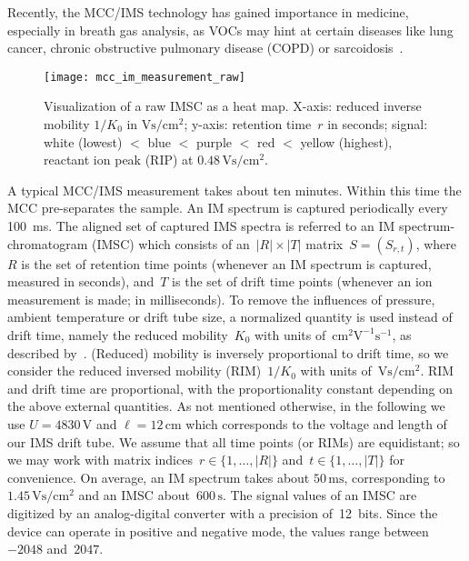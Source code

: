 \documentclass{article}
\begin{document}
Recently, the MCC/IMS technology has gained importance in medicine, especially in breath gas analysis, as VOCs may hint at certain diseases like lung cancer, chronic obstructive pulmonary disease (COPD) or sarcoidosis~\citep{Westhoff/etal/2009a, bodeker2008peakcomp, bunkowski/etal/2009a, westhoff2010differentiation}.


\begin{figure*}[t]\centering
\texttt{[image: mcc\_im\_measurement\_raw]}
\caption{
Visualization of a raw IMSC as a heat map.
X-axis: reduced inverse mobility $1/K_0$ in $\text{Vs}/\text{cm}^2$; 
y-axis: retention time~$r$ in seconds; 
signal: white (lowest) $<$ blue $<$ purple $<$ red $<$ yellow (highest), reactant ion peak (RIP) at $0.48\,\text{Vs}/\text{cm}^2$.
}
\label{fig:visualized-imsc}
\end{figure*}

A typical MCC/IMS measurement takes about ten minutes.
Within this time the MCC pre-separates the sample.
An IM spectrum is captured periodically every 100~ms.
The aligned set of captured IMS spectra is referred to an IM spectrum-chromatogram (IMSC) which consists of an~$|R| \times |T|$ matrix~$S = (S_{r,t})$, where~$R$ is the set of retention time points (whenever an IM spectrum is captured, measured in seconds), and~$T$ is the set of drift time points (whenever an ion measurement is made; in milliseconds).
To remove the influences of pressure, ambient temperature or drift tube size, a normalized quantity is used instead of drift time, namely the reduced mobility~$K_0$ with units of~$\text{cm}^2\text{V}^{-1}\text{s}^{-1}$, as described by~\cite{eiceman/2010a}.
(Reduced) mobility is inversely proportional to drift time, so we consider the reduced inversed mobility (RIM)~$1/K_0$ with units of~$\text{Vs}/\text{cm}^2$.
RIM and drift time are proportional, with the proportionality constant depending on the above external quantities.
As not mentioned otherwise, in the following we use $U=4830\,\text{V}$ and $\ell=12\,\text{cm}$ which corresponds to the voltage and length of our IMS drift tube.
We assume that all time points (or RIMs) are equidistant; 
so we may work with matrix indices~$r\in\{1,\dots,|R|\}$ and~$t\in\{1,\dots,|T|\}$ for convenience.
On average, an IM spectrum takes about $50\,\text{ms}$, corresponding to $1.45\,\text{Vs}/\text{cm}^2$ and an IMSC about~$600\,\text{s}$.
The signal values of an IMSC are digitized by an analog-digital converter with a precision of~12~bits.
Since the device can operate in positive and negative mode, the values range between~$-2048$ and~$2047$.
\end{document}
